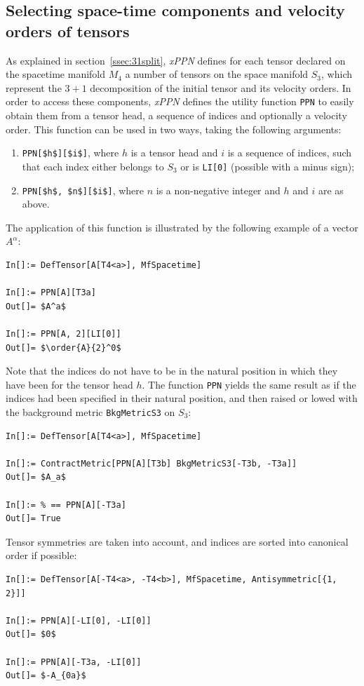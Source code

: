 \documentclass[notitlepage,a4paper,aps,prd,onecolumn,superscriptaddress,nofootinbib,groupedaddress,longbibliography]{revtex4-1}
\newcommand{\order}[2]{\accentset{#2}{#1}}
\newcommand{\xPPN}{\emph{xPPN}}
\begin{document}
\subsection{Selecting space-time components and velocity orders of tensors}\label{ssec:stvelsel}
As explained in section~\ref{ssec:31split}, \xPPN{} defines for each tensor declared on the spacetime manifold \(M_4\) a number of tensors on the space manifold \(S_3\), which represent the $3+1$ decomposition of the initial tensor and its velocity orders. In order to access these components, \xPPN{} defines the utility function \lstinline/PPN/ to easily obtain them from a tensor head, a sequence of indices and optionally a velocity order. This function can be used in two ways, taking the following arguments:
\begin{enumerate}
\item
\lstinline/PPN[$h$][$i$]/, where \(h\) is a tensor head and \(i\) is a sequence of indices, such that each index either belongs to \(S_3\) or is \lstinline/LI[0]/ (possible with a minus sign);
\item
\lstinline/PPN[$h$, $n$][$i$]/, where \(n\) is a non-negative integer and \(h\) and \(i\) are as above.
\end{enumerate}
The application of this function is illustrated by the following example of a vector \(A^{\alpha}\):
\begin{lstlisting}
In[]:= DefTensor[A[T4<a>], MfSpacetime]

In[]:= PPN[A][T3a]
Out[]= $A^a$

In[]:= PPN[A, 2][LI[0]]
Out[]= $\order{A}{2}^0$
\end{lstlisting}
Note that the indices do not have to be in the natural position in which they have been for the tensor head \(h\). The function \lstinline/PPN/ yields the same result as if the indices had been specified in their natural position, and then raised or lowed with the background metric \lstinline/BkgMetricS3/ on \(S_3\):
\begin{lstlisting}
In[]:= DefTensor[A[T4<a>], MfSpacetime]

In[]:= ContractMetric[PPN[A][T3b] BkgMetricS3[-T3b, -T3a]]
Out[]= $A_a$

In[]:= % == PPN[A][-T3a]
Out[]= True
\end{lstlisting}
Tensor symmetries are taken into account, and indices are sorted into canonical order if possible:
\begin{lstlisting}
In[]:= DefTensor[A[-T4<a>, -T4<b>], MfSpacetime, Antisymmetric[{1, 2}]]

In[]:= PPN[A][-LI[0], -LI[0]]
Out[]= $0$

In[]:= PPN[A][-T3a, -LI[0]]
Out[]= $-A_{0a}$
\end{lstlisting}
\end{document}
